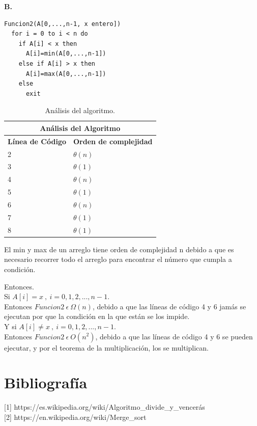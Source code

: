 \documentclass[12pt]{report}
\begin{document}
	\textbf{B.}
	\lstset{language=vhdl, breaklines=true, basicstyle=\footnotesize}
	\lstset{numbers=left, numberstyle=\tiny, stepnumber=1, numbersep=10pt}
	\begin{lstlisting}
Funcion2(A[0,...,n-1, x entero])
  for i = 0 to i < n do
    if A[i] < x then
      A[i]=min(A[0,...,n-1])
    else if A[i] > x then
      A[i]=max(A[0,...,n-1])
    else
      exit
	\end{lstlisting}
	
	\begin{table}[htbp]
		\begin{center}
			\begin{tabular}{|l|l|}
				\hline
				\multicolumn{2}{|c|}{Análisis del Algoritmo} \\ 
				\hline
				\textbf{Línea de Código} & \textbf{Orden de complejidad}\\
				\hline
				2 & $\theta (n)$ \\ \hline
				3 & $\theta (1)$ \\ \hline
				4 & $\theta (n)$ \\ \hline
				5 & $\theta (1)$ \\ \hline
				6 & $\theta (n)$ \\ \hline
				7 & $\theta (1)$ \\ \hline
				8 & $\theta (1)$ \\ \hline
			\end{tabular}
			\caption{Análisis del algoritmo.}
			\label{tabla:analisis4}
		\end{center}
	\end{table}
	
	El min y max de un arreglo tiene orden de complejidad n debido a que es necesario recorrer todo el arreglo para encontrar el número que cumpla a condición. 
	
	Entonces. \\
	
	Si $A[i]=x \ , \ i=0,1,2,...,n-1.$\\
	
	Entonces $Funcion2 \ \epsilon \ \Omega(n)$, debido a que las líneas de código 4 y 6 jamás se ejecutan por que la condición en la que están se los impide.\\
	
	Y si $A[i]\neq x \ , \ i=0,1,2,...,n-1.$\\
	
	Entonces $Funcion2 \ \epsilon \ O(n^{2})$, debido a que las líneas de código 4 y 6 se pueden ejecutar, y por el teorema de la multiplicación, los se multiplican. 
	
	\section{Bibliografía}
	
	[1] https://es.wikipedia.org/wiki/Algoritmo\_divide\_y\_vencerás\\
	
	[2] https://en.wikipedia.org/wiki/Merge\_sort
\end{document}
